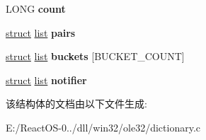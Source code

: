 \begin{DoxyCompactItemize}
\item 
\mbox{\label{structdictionary_ab65573a8924cdad1f02e37ddb15dc455}} 
L\+O\+NG {\bfseries count}
\item 
\mbox{\label{structdictionary_a04dc02b18748a077079f473d477763fd}} 
\hyperlink{interfacestruct}{struct} \hyperlink{classlist}{list} {\bfseries pairs}
\item 
\mbox{\label{structdictionary_a6235bc3a1910364d8c4606e8b861c34c}} 
\hyperlink{interfacestruct}{struct} \hyperlink{classlist}{list} {\bfseries buckets} \mbox{[}B\+U\+C\+K\+E\+T\+\_\+\+C\+O\+U\+NT\mbox{]}
\item 
\mbox{\label{structdictionary_a7706758d341cd459fe91c9004f3d2413}} 
\hyperlink{interfacestruct}{struct} \hyperlink{classlist}{list} {\bfseries notifier}
\end{DoxyCompactItemize}


该结构体的文档由以下文件生成\+:\begin{DoxyCompactItemize}
\item 
E\+:/\+React\+O\+S-\/0../dll/win32/ole32/dictionary.\+c\end{DoxyCompactItemize}
